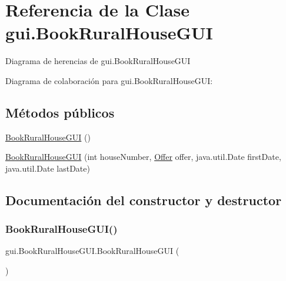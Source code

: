 \hypertarget{classgui_1_1_book_rural_house_g_u_i}{}\section{Referencia de la Clase gui.\+Book\+Rural\+House\+G\+UI}
\label{classgui_1_1_book_rural_house_g_u_i}


Diagrama de herencias de gui.\+Book\+Rural\+House\+G\+UI


Diagrama de colaboración para gui.\+Book\+Rural\+House\+G\+UI\+:
\subsection*{Métodos públicos}
\begin{DoxyCompactItemize}
\item 
\mbox{\hyperlink{classgui_1_1_book_rural_house_g_u_i_ab8bd4d8ebc00d7a6753ebc1426228520}{Book\+Rural\+House\+G\+UI}} ()
\item 
\mbox{\hyperlink{classgui_1_1_book_rural_house_g_u_i_ab5082ea450d86eda88075eecbbfe2b74}{Book\+Rural\+House\+G\+UI}} (int house\+Number, \mbox{\hyperlink{classdomain_1_1_offer}{Offer}} offer, java.\+util.\+Date first\+Date, java.\+util.\+Date last\+Date)
\end{DoxyCompactItemize}


\subsection{Documentación del constructor y destructor}
\mbox{\label{classgui_1_1_book_rural_house_g_u_i_ab8bd4d8ebc00d7a6753ebc1426228520}} 
\subsubsection{\texorpdfstring{BookRuralHouseGUI()}{BookRuralHouseGUI()}\hspace{0.1cm}{\footnotesize\ttfamily [1/2]}}
{\footnotesize\ttfamily gui.\+Book\+Rural\+House\+G\+U\+I.\+Book\+Rural\+House\+G\+UI (\begin{DoxyParamCaption}{ }\end{DoxyParamCaption})}

\mbox{\label{classgui_1_1_book_rural_house_g_u_i_ab5082ea450d86eda88075eecbbfe2b74}} 
